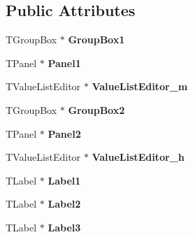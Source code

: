 \subsection*{Public Attributes}
\begin{DoxyCompactItemize}
\item 
\hypertarget{class_t_h_h_current_form_a0fac9b873a7f2d422542f6a7ec7d74d4}{T\+Group\+Box $\ast$ {\bfseries Group\+Box1}}\label{class_t_h_h_current_form_a0fac9b873a7f2d422542f6a7ec7d74d4}

\item 
\hypertarget{class_t_h_h_current_form_aafb019a81b2e9d56fb5b424ab5fdf51e}{T\+Panel $\ast$ {\bfseries Panel1}}\label{class_t_h_h_current_form_aafb019a81b2e9d56fb5b424ab5fdf51e}

\item 
\hypertarget{class_t_h_h_current_form_ab61f0a096aae196111b0923a65a152af}{T\+Value\+List\+Editor $\ast$ {\bfseries Value\+List\+Editor\+\_\+m}}\label{class_t_h_h_current_form_ab61f0a096aae196111b0923a65a152af}

\item 
\hypertarget{class_t_h_h_current_form_ad63b6047704a7c4dec3bf02ef9a83513}{T\+Group\+Box $\ast$ {\bfseries Group\+Box2}}\label{class_t_h_h_current_form_ad63b6047704a7c4dec3bf02ef9a83513}

\item 
\hypertarget{class_t_h_h_current_form_afed927065064065b3178138763fccbe7}{T\+Panel $\ast$ {\bfseries Panel2}}\label{class_t_h_h_current_form_afed927065064065b3178138763fccbe7}

\item 
\hypertarget{class_t_h_h_current_form_a16ca77686ef30a6925b6313b3539411c}{T\+Value\+List\+Editor $\ast$ {\bfseries Value\+List\+Editor\+\_\+h}}\label{class_t_h_h_current_form_a16ca77686ef30a6925b6313b3539411c}

\item 
\hypertarget{class_t_h_h_current_form_a53d70c024e556d69c0bc61f4e63c7e3c}{T\+Label $\ast$ {\bfseries Label1}}\label{class_t_h_h_current_form_a53d70c024e556d69c0bc61f4e63c7e3c}

\item 
\hypertarget{class_t_h_h_current_form_a4f6ba8133879ea576f10cb75413a7d6d}{T\+Label $\ast$ {\bfseries Label2}}\label{class_t_h_h_current_form_a4f6ba8133879ea576f10cb75413a7d6d}

\item 
\hypertarget{class_t_h_h_current_form_aefb08748e9aab83dcb112f3e85b9bc45}{T\+Label $\ast$ {\bfseries Label3}}\label{class_t_h_h_current_form_aefb08748e9aab83dcb112f3e85b9bc45}


\end{DoxyCompactItemize}
